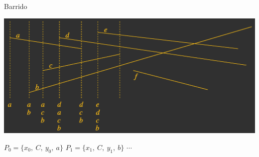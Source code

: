     
    \begin{frame}{Barrido}
    \begin{center}
    
    \includegraphics[width=\textwidth]{img/bosweep.png}
    
    \bigskip
    
    $P_0=\{x_0,\ C,\ y_0,\ a\}$ \quad $P_1=\{x_1,\ C,\ y_1,\ b\}$ \quad $\cdots$%
    
    
    
    \end{center}
    \end{frame}
    
